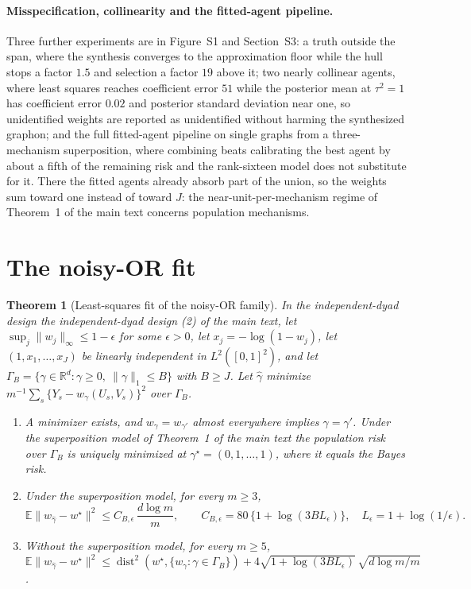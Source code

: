 \documentclass[12pt]{article}
\newcommand{\R}{\mathbb{R}}
\newcommand{\E}{\mathbb{E}}
\newcommand{\dist}{\operatorname{dist}}
\newcommand{\supn}[1]{\|#1\|_{\infty}}
\newcommand{\norm}[1]{\|#1\|}
\newcommand{\wstar}{w^{\star}}
\newtheorem{theoremS}{Theorem}
\begin{document}
\paragraph{Misspecification, collinearity and the fitted-agent pipeline.}
Three further experiments are in Figure~S1 and Section~S3: a truth outside the span, where the synthesis converges to the approximation floor while the hull stops a factor $1.5$ and selection a factor $19$ above it; two nearly collinear agents, where least squares reaches coefficient error $51$ while the posterior mean at $\tau^2=1$ has coefficient error $0.02$ and posterior standard deviation near one, so unidentified weights are reported as unidentified without harming the synthesized graphon; and the full fitted-agent pipeline on single graphs from a three-mechanism superposition, where combining beats calibrating the best agent by about a fifth of the remaining risk and the rank-sixteen model does not substitute for it. There the fitted agents already absorb part of the union, so the weights sum toward one instead of toward $J$: the near-unit-per-mechanism regime of Theorem~1 of the main text concerns population mechanisms.

\section{The noisy-OR fit}
\label{sec:Shazard}

\begin{theoremS}[Least-squares fit of the noisy-OR family]
\label{thm:hazardS}
In the independent-dyad design the independent-dyad design (2) of the main text, let $\sup_j\supn{w_j}\le1-\epsilon$ for some $\epsilon>0$, let $x_j=-\log(1-w_j)$, let $(1,x_1,\dots,x_J)$ be linearly independent in $L^2([0,1]^2)$, and let $\Gamma_B=\{\gamma\in\R^{d}:\gamma\ge0,\ \norm{\gamma}_1\le B\}$ with $B\ge J$. Let $\hat\gamma$ minimize $m^{-1}\sum_s\{Y_s-w_\gamma(U_s,V_s)\}^2$ over $\Gamma_B$.
\begin{enumerate}
\item[(i)] A minimizer exists, and $w_\gamma=w_{\gamma'}$ almost everywhere implies $\gamma=\gamma'$. Under the superposition model of Theorem~1 of the main text the population risk over $\Gamma_B$ is uniquely minimized at $\gamma^\star=(0,1,\dots,1)$, where it equals the Bayes risk.
\item[(ii)] Under the superposition model, for every $m\ge3$,
\[
\E\norm{w_{\hat\gamma}-\wstar}^2\le C_{B,\epsilon}\,\frac{d\log m}{m},\qquad C_{B,\epsilon}=80\,\{1+\log(3BL_\epsilon)\},\quad L_\epsilon=1+\log(1/\epsilon).
\]
\item[(iii)] Without the superposition model, for every $m\ge5$, $\E\norm{w_{\hat\gamma}-\wstar}^2\le\dist^2(\wstar,\{w_\gamma:\gamma\in\Gamma_B\})+4\sqrt{1+\log(3BL_\epsilon)}\,\sqrt{d\log m/m}$.
\end{enumerate}
\end{theoremS}
\end{document}
